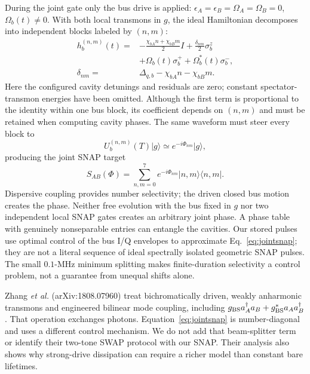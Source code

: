 \documentclass[aps,prb,reprint,amsmath,amssymb,nofootinbib]{revtex4-2}
\newcommand{\ket}[1]{\lvert#1\rangle}
\newcommand{\bra}[1]{\langle#1\rvert}
\begin{document}
During the joint gate only the bus drive is applied:
$\epsilon_A=\epsilon_B=\Omega_A=\Omega_B=0$, $\Omega_b(t)\ne0$.
With both local transmons in $g$, the ideal Hamiltonian decomposes into
independent blocks labeled by $(n,m)$:
\begin{align}
 h_b^{(n,m)}(t)={}&-\frac{\chi_{bA}n+\chi_{bB}m}{2}I
                     +\frac{\delta_{nm}}2\sigma_b^z\nonumber\\
                 &+\Omega_b(t)\sigma_b^++\Omega_b^*(t)\sigma_b^-,\\
 \delta_{nm}={}&\Delta_{q,b}-\chi_{bA}n-\chi_{bB}m.
 \label{eq:busblock}
\end{align}
Here the configured cavity detunings and residuals are zero; constant
spectator-transmon energies have been omitted. Although the first term
is proportional to the identity within one bus block, its coefficient
depends on $(n,m)$ and must be retained when computing cavity phases.
The same
waveform must steer every block to
\begin{equation}
 U_b^{(n,m)}(T)\ket g\simeq e^{-i\Phi_{nm}}\ket g,
\end{equation}
producing the joint SNAP target
\begin{equation}
 S_{AB}(\Phi)=\sum_{n,m=0}^{7}e^{-i\Phi_{nm}}
                  \ket{n,m}\bra{n,m}.
 \label{eq:jointsnap}
\end{equation}
Dispersive coupling provides number selectivity; the driven closed bus
motion creates the phase. Neither free evolution with the bus fixed in
$g$ nor two independent local SNAP gates creates an arbitrary joint
phase. A phase table with genuinely nonseparable entries can entangle
the cavities. Our stored pulses use optimal control of the bus I/Q
envelopes to approximate Eq.~\eqref{eq:jointsnap}; they are not a literal
sequence of ideal spectrally isolated geometric SNAP pulses.
The small $0.1$-MHz minimum splitting makes finite-duration selectivity a
control problem, not a guarantee from unequal shifts alone.

Zhang \emph{et al.}\cite{Zhang2019} (arXiv:1808.07960) treat bichromatically driven, weakly anharmonic
transmons and engineered bilinear mode coupling, including
$g_{\rm BS}a_A^\dagger a_B+g_{\rm BS}^*a_Aa_B^\dagger$.
That operation exchanges photons. Equation~\eqref{eq:jointsnap} is
number-diagonal and uses a different control mechanism. We do not add
that beam-splitter term or identify their two-tone SWAP protocol with
our SNAP. Their analysis also shows why strong-drive dissipation can
require a richer model than constant bare lifetimes.
\end{document}
